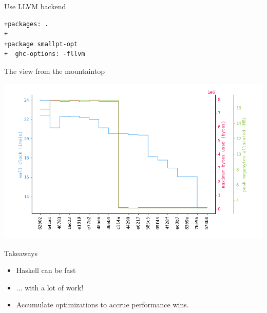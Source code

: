 \documentclass[8pt]{beamer}
\begin{document}
\begin{frame}[fragile]{Use LLVM backend}
\begin{verbatim}
+packages: .
+
+package smallpt-opt
+  ghc-options: -fllvm
\end{verbatim}
\end{frame}



\begin{frame}[fragile]{The view from the mountaintop}

\includegraphics[height=0.6\textwidth]{./perfdata-gen.png}

\end{frame}


\begin{frame}[fragile]{Takeaways}
\pause
\begin{itemize}
\item Haskell can be fast \pause
\item ... with a lot of work! \pause
\item Accumulate optimizations to accrue performance wins. \pause
\end{itemize}
\end{frame}
\end{document}
